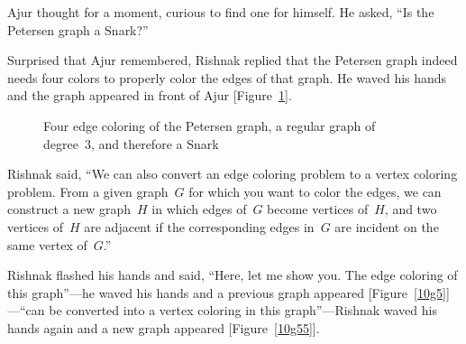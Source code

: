 Ajur thought for a moment, curious to find one for himself. He asked, ``Is the Petersen graph a Snark?''

Surprised that Ajur remembered, Rishnak replied that the Petersen graph indeed needs four colors to properly color the edges of that graph. He waved his hands and the graph appeared in front of Ajur [Figure~\ref{10g7}].

\begin{figure}
\begin{center}
\caption{Four edge coloring of the Petersen graph, a regular graph of degree~3, and therefore a Snark}\label{10g7}
\end{center}
\end{figure}

Rishnak said, ``We can also convert an edge coloring problem to a vertex coloring problem. From a given graph~$G$ for which you want to color the edges, we can construct a new graph~$H$ in which edges of~$G$ become vertices of~$H$, and two vertices of~$H$ are adjacent if the corresponding edges in~$G$ are incident on the same vertex of~$G$.''

Rishnak flashed his hands and said, ``Here, let me show you.  The edge coloring of this graph''---he waved his hands and a previous graph appeared [Figure~\ref{10g5}]---``can be converted into a vertex coloring in this graph''---Rishnak waved his hands again and a new graph appeared [Figure~\ref{10g55}].

